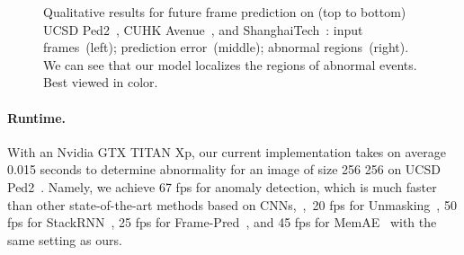 \documentclass[10pt,twocolumn,letterpaper]{article}
\begin{document}
		\begin{figure}
  			\centering
  			\renewcommand*{\thesubfigure}{}
  			\hspace{-0.22cm} 
			\hspace{-0.22cm}
			\vspace{-0.3cm}
			\caption{Qualitative results for future frame prediction on (top to bottom) UCSD Ped2~\cite{li2013anomaly}, CUHK Avenue~\cite{lu2013abnormal}, and ShanghaiTech~\cite{luo2017revisit}: input frames~(left); prediction error~(middle); abnormal regions~(right). We can see that our model localizes the regions of abnormal events. Best viewed in color.}
			\vspace{-0.4cm}
			\label{fig:Qualitative}
		\end{figure}

			
\vspace{-0.4cm}			
		\paragraph{Runtime.}
			With an Nvidia GTX TITAN Xp, our current implementation takes on average 0.015 seconds to determine abnormality for an image of size 256  256 on UCSD Ped2~\cite{li2013anomaly}. Namely, we achieve 67 fps for anomaly detection, which is much faster than other state-of-the-art methods based on CNNs,~\eg,~20 fps for Unmasking~\cite{tudor2017unmasking}, 50 fps for StackRNN~\cite{luo2017revisit}, 25 fps for Frame-Pred~\cite{liu2018future}, and 45 fps for MemAE~\cite{gong2019memorizing} with the same setting as ours. 
\end{document}
